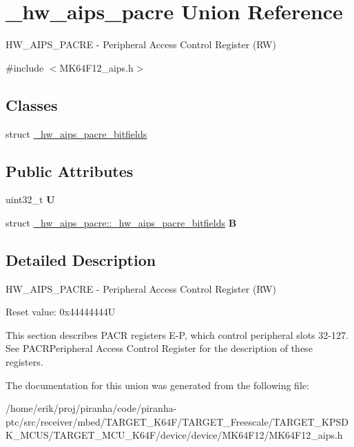 \hypertarget{union__hw__aips__pacre}{}\section{\+\_\+hw\+\_\+aips\+\_\+pacre Union Reference}
\label{union__hw__aips__pacre}


H\+W\+\_\+\+A\+I\+P\+S\+\_\+\+P\+A\+C\+RE -\/ Peripheral Access Control Register (RW)  




{\ttfamily \#include $<$M\+K64\+F12\+\_\+aips.\+h$>$}

\subsection*{Classes}
\begin{DoxyCompactItemize}
\item 
struct \hyperlink{struct__hw__aips__pacre_1_1__hw__aips__pacre__bitfields}{\+\_\+hw\+\_\+aips\+\_\+pacre\+\_\+bitfields}
\end{DoxyCompactItemize}
\subsection*{Public Attributes}
\begin{DoxyCompactItemize}
\item 
uint32\+\_\+t {\bfseries U}\hypertarget{union__hw__aips__pacre_a34f17844ee58edcc66a7710746d257fb}{}\label{union__hw__aips__pacre_a34f17844ee58edcc66a7710746d257fb}

\item 
struct \hyperlink{struct__hw__aips__pacre_1_1__hw__aips__pacre__bitfields}{\+\_\+hw\+\_\+aips\+\_\+pacre\+::\+\_\+hw\+\_\+aips\+\_\+pacre\+\_\+bitfields} {\bfseries B}\hypertarget{union__hw__aips__pacre_a92da8188bde5c85b554f2d146cec17ca}{}\label{union__hw__aips__pacre_a92da8188bde5c85b554f2d146cec17ca}

\end{DoxyCompactItemize}


\subsection{Detailed Description}
H\+W\+\_\+\+A\+I\+P\+S\+\_\+\+P\+A\+C\+RE -\/ Peripheral Access Control Register (RW) 

Reset value\+: 0x44444444U

This section describes P\+A\+CR registers E-\/P, which control peripheral slots 32-\/127. See P\+A\+C\+R\+Peripheral Access Control Register for the description of these registers. 

The documentation for this union was generated from the following file\+:\begin{DoxyCompactItemize}
\item 
/home/erik/proj/piranha/code/piranha-\/ptc/src/receiver/mbed/\+T\+A\+R\+G\+E\+T\+\_\+\+K64\+F/\+T\+A\+R\+G\+E\+T\+\_\+\+Freescale/\+T\+A\+R\+G\+E\+T\+\_\+\+K\+P\+S\+D\+K\+\_\+\+M\+C\+U\+S/\+T\+A\+R\+G\+E\+T\+\_\+\+M\+C\+U\+\_\+\+K64\+F/device/device/\+M\+K64\+F12/M\+K64\+F12\+\_\+aips.\+h\end{DoxyCompactItemize}
